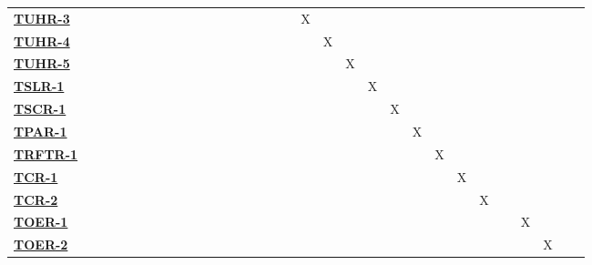 \documentclass[12pt, titlepage]{article}
\begin{document}
\begin{table}
\begin{adjustbox}{width=1.2\textwidth}
\begin{tabular}{l|ccccccccccccccccccccccccc}
        \hyperref[TUHR-3]{\textbf{TUHR-3}}  & ~ & ~ & ~ & ~ & ~ & ~ & ~ & ~ & ~ & ~ & ~ & X & ~ & ~ & ~ & ~ & ~ & ~ & ~ & ~ & ~ & ~ & ~\\
        \hyperref[TUHR-4]{\textbf{TUHR-4}}  & ~ & ~ & ~ & ~ & ~ & ~ & ~ & ~ & ~ & ~ & ~ & ~ & X & ~ & ~ & ~ & ~ & ~ & ~ & ~ & ~ & ~ & ~\\
        \hyperref[TUHR-5]{\textbf{TUHR-5}}  & ~ & ~ & ~ & ~ & ~ & ~ & ~ & ~ & ~ & ~ & ~ & ~ & ~ & X & ~ & ~ & ~ & ~ & ~ & ~ & ~ & ~ & ~\\
        \hyperref[TSLR-1]{\textbf{TSLR-1}}  & ~ & ~ & ~ & ~ & ~ & ~ & ~ & ~ & ~ & ~ & ~ & ~ & ~ & ~ & X & ~ & ~ & ~ & ~ & ~ & ~ & ~ & ~\\
        \hyperref[TSCR-1]{\textbf{TSCR-1}}  & ~ & ~ & ~ & ~ & ~ & ~ & ~ & ~ & ~ & ~ & ~ & ~ & ~ & ~ & ~ & X & ~ & ~ & ~ & ~ & ~ & ~ & ~\\
        \hyperref[TPAR-1]{\textbf{TPAR-1}}  & ~ & ~ & ~ & ~ & ~ & ~ & ~ & ~ & ~ & ~ & ~ & ~ & ~ & ~ & ~ & ~ & X & ~ & ~ & ~ & ~ & ~ & ~\\
        \hyperref[TRFTR-1]{\textbf{TRFTR-1}}  & ~ & ~ & ~ & ~ & ~ & ~ & ~ & ~ & ~ & ~ & ~ & ~ & ~ & ~ & ~ & ~ & ~ & X & ~ & ~ & ~ & ~ & ~\\
        \hyperref[TCR-1]{\textbf{TCR-1}}  & ~ & ~ & ~ & ~ & ~ & ~ & ~ & ~ & ~ & ~ & ~ & ~ & ~ & ~ & ~ & ~ & ~ & ~ & X & ~ & ~ & ~ & ~\\
        \hyperref[TCR-2]{\textbf{TCR-2}}  & ~ & ~ & ~ & ~ & ~ & ~ & ~ & ~ & ~ & ~ & ~ & ~ & ~ & ~ & ~ & ~ & ~ & ~ & ~ & X & ~ & ~ & ~\\
        \hyperref[TOER-1]{\textbf{TOER-1}}  & ~ & ~ & ~ & ~ & ~ & ~ & ~ & ~ & ~ & ~ & ~ & ~ & ~ & ~ & ~ & ~ & ~ & ~ & ~ & ~ & ~ & X & ~\\
        \hyperref[TOER-2]{\textbf{TOER-2}}  & ~ & ~ & ~ & ~ & ~ & ~ & ~ & ~ & ~ & ~ & ~ & ~ & ~ & ~ & ~ & ~ & ~ & ~ & ~ & ~ & ~ &  & X\\
    \end{tabular}
    \end{adjustbox}
\end{table}
\end{document}
